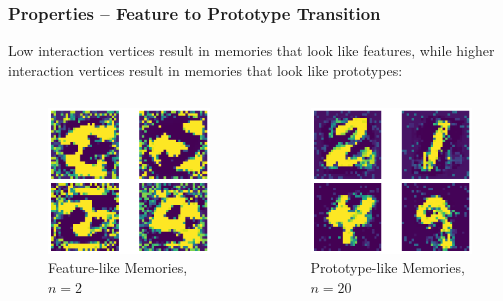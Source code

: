 \begin{frame}
    \frametitle{Properties -- Feature to Prototype Transition}

Low interaction vertices result in memories that look like features, while higher interaction vertices result in memories that look like prototypes:

\begin{columns}
    \begin{figure}
        \includegraphics[width=\textwidth]{images/featureDetector.png}
        \caption{Feature-like Memories, \(n=2\)}
    \end{figure}
    \pause
    \begin{figure}
        \includegraphics[width=\textwidth]{images/prototypeMemory.png}
        \caption{Prototype-like Memories, \(n=20\)}
    \end{figure}
\end{columns}
\end{frame}